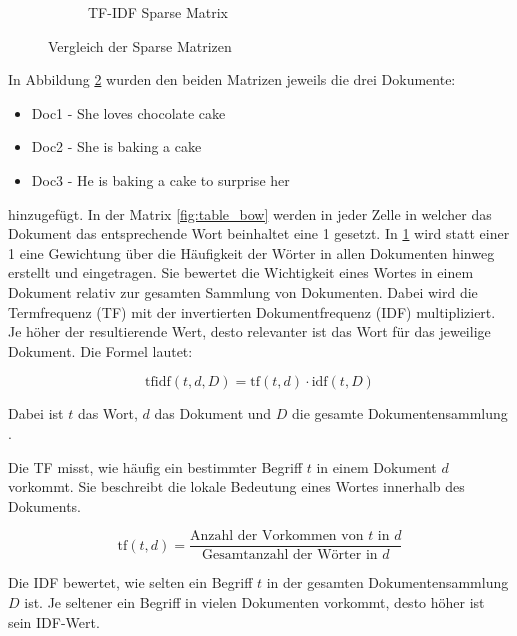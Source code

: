 \begin{figure}[h]
\begin{subfigure}{0.5\textwidth}
        \caption{\label{fig:table_tf-idf} TF-IDF Sparse Matrix \cite{Buddhadev2025}}
    \end{subfigure}
    
    \caption{Vergleich der Sparse Matrizen}
    \label{fig:vlg_sparse_matrizen}
\end{figure}

In Abbildung \ref{fig:vlg_sparse_matrizen} wurden den beiden Matrizen jeweils die drei Dokumente:

\begin{itemize}
    \item Doc1 - She loves chocolate cake
    \item Doc2 - She is baking a cake
    \item Doc3 - He is baking a cake to surprise her
\end{itemize}

hinzugefügt. In der Matrix \ref{fig:table_bow} werden in jeder Zelle in welcher das Dokument das entsprechende Wort beinhaltet eine 1 gesetzt.
In \ref{fig:table_tf-idf} wird statt einer 1 eine Gewichtung über die Häufigkeit der Wörter in allen Dokumenten hinweg erstellt und eingetragen.
Sie bewertet die Wichtigkeit eines Wortes in einem Dokument relativ zur gesamten Sammlung von Dokumenten. Dabei wird die Termfrequenz (TF) mit der 
invertierten Dokumentfrequenz (IDF) multipliziert. Je höher der resultierende Wert, desto relevanter ist das Wort für das jeweilige Dokument. 
Die Formel lautet:

\begin{equation}
    \text{tfidf}(t, d, D) = \text{tf}(t, d) \cdot \text{idf}(t, D)
\end{equation}

Dabei ist \( t \) das Wort, \( d \) das Dokument und \( D \) die gesamte Dokumentensammlung \cite{aslam2022}.

Die TF misst, wie häufig ein bestimmter Begriff \( t \) in einem Dokument \( d \) vorkommt. 
Sie beschreibt die lokale Bedeutung eines Wortes innerhalb des Dokuments.

\begin{equation}
\text{tf}(t, d) = \frac{\text{Anzahl der Vorkommen von } t \text{ in } d}{\text{Gesamtanzahl der Wörter in } d}
\end{equation}

Die IDF bewertet, wie selten ein Begriff \( t \) in der gesamten Dokumentensammlung \( D \) ist. 
Je seltener ein Begriff in vielen Dokumenten vorkommt, desto höher ist sein IDF-Wert.

